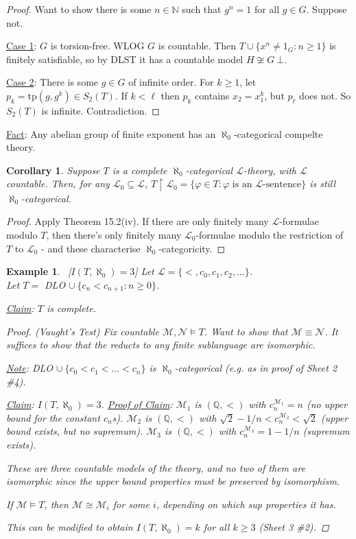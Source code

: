 \documentclass[]{article}
\theoremstyle{custhm}
\theoremstyle{cusdef}
\theoremstyle{custhm}
\theoremstyle{custhm}
\newtheorem{cor}[theorem]{Corollary}
\theoremstyle{custhm}
\theoremstyle{ex}
\newtheorem{ex}[theorem]{Example}
\theoremstyle{custhm}
\theoremstyle{cusdef}
\theoremstyle{remark}
\theoremstyle{remark}
\newcommand{\Q}{\mathbb{Q}}
\renewcommand{\L}{\mathcal{L}}
\renewcommand{\it}[1]{\textit{#1}}
\newcommand{\M}{\mathcal{M}}
\renewcommand{\phi}{\varphi}
\newcommand{\tp}{\textrm{tp}}
\newcommand{\false}{\bot}
\newcommand{\N}{\mathcal{N}}
\renewcommand{\subset}{\subseteq}
\begin{document}
\begin{proof}
	Want to show there is some $n\in \mathbb{N}$ such that $g^n = 1$ for all $g\in G$. Suppose not.

	\underline{Case 1}: $G$ is torsion-free. WLOG $G$ is countable. Then $T\cup \{x^n\ne 1_G : n\ge 1\}$ is finitely satisfiable, so by DLST it has a countable model $H\not\cong G\ \false$.

	\underline{Case 2}: There is some $g \in G$ of infinite order. For $k \ge 1$, let $p_k = \tp(g,g^k)\in S_2(T)$. If $k < \ell$ then $p_k$ contains $x_2 = x_1^k$, but $p_\ell$ does not. So $S_2(T)$ is infinite. Contradiction.
\end{proof}

\underline{Fact}: Any abelian group of finite exponent has an $\aleph_0$-categorical compelte theory.

\begin{cor}
	Suppose $T$ is a complete $\aleph_0$-categorical $\L$-theory, with $\L$ countable. Then, for any $\L_0 \subset \L$, $T\upharpoonright \L_0 = \{\phi\in T:\phi \textrm{ is an }\L\textrm{-sentence}\}$ is still $\aleph_0$-categorical.
\end{cor}
\begin{proof}
	Apply Theorem 15.2(iv). If there are only finitely many $\L$-formulae modulo $T$, then there's only finitely many $\L_0$-formulae modulo the restriction of $T$ to $\L_0$ - and these characterise $\aleph_0$-categoricity.
\end{proof}
\begin{ex}\ [$I(T,\aleph_0) = 3$] Let $\L = \{<,c_0,c_1,c_2,\dots\}$.\ \\
	Let $T = $ DLO $\cup\ \{c_n<c_{n+1}:n\ge0\}$.

	\underline{Claim}: $T$ is complete.
	\begin{proof}(Vaught's Test)
		Fix countable $\M,\N\models T$. Want to show that $\M\equiv \N$. It suffices to show that the reducts to any finite sublanguage are isomorphic.
		
		\underline{Note}: DLO $\cup\ \{c_0 < c_1<\dots < c_n\}$ is $\aleph_0$-categorical (\it{e.g.} as in proof of Sheet 2 \#4).

		\underline{Claim}: $I(T,\aleph_0) = 3$.
		\underline{Proof of Claim}: $\M_1$ is $(\Q,<)$ with $c_n^{\M_1} = n$ (no upper bound for the constant $c_n$s). $\M_2$ is $(\Q,<)$ with $\sqrt{2} - 1/n < c_n^{\M_2} < \sqrt{2}$ (upper bound exists, but no supremum).
		$\M_3$ is $(\Q,<)$ with $c_n^{\M_3} = 1 - 1/n$ (supremum exists).

		These are three countable models of the theory, and no two of them are isomorphic since the upper bound properties must be preserved by isomorphism.

		If $\M\models T$, then $\M\cong \M_i$ for some $i$, depending on which sup properties it has.

		This can be modified to obtain $I(T,\aleph_0) = k$ for all $k\ge 3$ (Sheet 3 \#2).
	\end{proof}
\end{ex}
\end{document}

